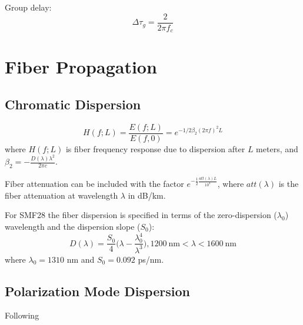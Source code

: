 \documentclass[a4paper]{article}
\begin{document}
Group delay:
\begin{equation}
\Delta\tau_g = \frac{2}{2\pi f_c}
\end{equation}

\section{Fiber Propagation}
\subsection{Chromatic Dispersion}
\begin{equation}
H(f; L) = \frac{E(f; L)}{E(f, 0)} = e^{-1/2\beta_2(2\pi f)^2L}
\end{equation}
where $H(f; L)$ is fiber frequency response due to dispersion after $L$ meters, and $\beta_2 = -\frac{D(\lambda)\lambda^2}{2\pi c}$. 

Fiber attenuation can be included with the factor $e^{-\frac{1}{2}\frac{att(\lambda)L}{10^4}}$, where $att(\lambda)$ is the fiber attenuation at wavelength $\lambda$ in dB/km.

For SMF28 the fiber dispersion is specified in terms of the zero-dispersion ($\lambda_0$) wavelength and the dispersion slope ($S_0$):
\begin{equation}
D(\lambda) = \frac{S_0}{4}\bigg(\lambda - \frac{\lambda_0^4}{\lambda^3}\bigg), 1200~\text{nm} < \lambda < 1600~\text{nm}
\end{equation}
where $\lambda_0 = 1310$ nm and $S_0 = 0.092$ ps/nm.

\subsection{Polarization Mode Dispersion}
Following \cite{Ip2008}
\end{document}

